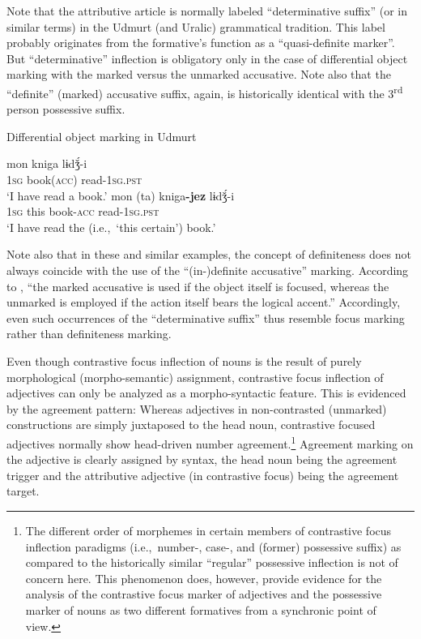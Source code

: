 Note that the attributive article is normally labeled “determinative suffix” (or in similar terms) in the Udmurt (and Uralic) grammatical tradition. This label probably originates from the formative's function as a “quasi-definite marker”. But “determinative” inflection is obligatory only in the case of differential object marking with the marked versus the unmarked accusative. Note also that the “definite” (marked) accusative suffix, again, is historically identical with the 3\textsuperscript{rd} person possessive suffix.%
\begin{exe}
\ex \rm{Differential object marking in Udmurt \citep[22]{winkler2001}}
\begin{xlist}
\ex
\gll	mon kniga lɨdǯ́-i\\
	\textsc{1sg} book(\textsc{acc}) read-\textsc{1sg.pst}\\
\glt	‘I have read a book.’
\ex	
\gll	mon (ta) kniga\textbf{-jez} lɨdǯ́-i\\
	\textsc{1sg} this book-\textsc{acc} read-\textsc{1sg.pst}\\
\glt	‘I have read the (i.e.,~‘this certain’) book.’
\end{xlist}
\end{exe}
Note also that in these and similar examples, the concept of definiteness does not always coincide with the use of the “(in-)definite accusative” marking. According to \citet[21]{winkler2001}, “the marked accusative is used if the object itself is focused, whereas the unmarked is employed if the action itself bears the logical accent.” Accordingly, even such occurrences of the “determinative suffix” thus resemble focus marking rather than definiteness marking.

Even though contrastive focus inflection of nouns is the result of purely morphological (morpho-semantic) assignment, contrastive focus inflection of adjectives can only be analyzed as a morpho-syntactic feature. This is evidenced by the agreement pattern: Whereas adjectives in non-contrasted (unmarked) constructions are simply juxtaposed to the head noun, contrastive focused adjectives normally show head\hyp{}driven number agreement.\footnote{The different order of morphemes in certain members of contrastive focus inflection paradigms (i.e.,~number-, case-, and (former) possessive suffix) as compared to the historically similar “regular” possessive inflection \citep[32]{winkler2001} is not of concern here. This phenomenon does, however, provide evidence for the analysis of the contrastive focus marker of adjectives and the possessive marker of nouns as two different formatives from a synchronic point of view.} Agreement marking on the adjective is clearly assigned by syntax, the head noun being the agreement trigger and the attributive adjective (in contrastive focus) being the agreement target.

